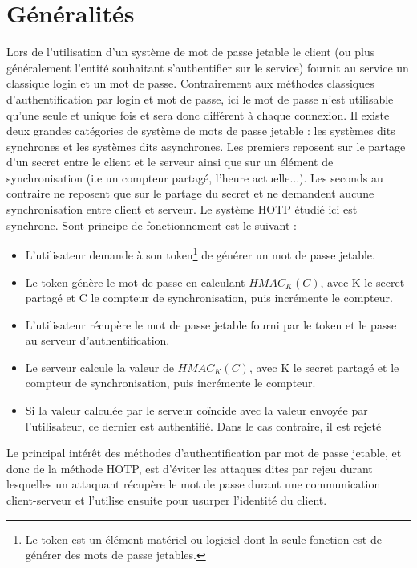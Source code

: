 \documentclass{../res/univ-projet}
\begin{document}
\section{Généralités}
Lors de l'utilisation d'un système de mot de passe jetable le client (ou plus généralement l'entité souhaitant s'authentifier sur le service) fournit au service un 
classique login et un mot de passe. Contrairement aux méthodes classiques d'authentification par login et mot de passe, ici le mot de passe n'est utilisable qu'une seule et 
unique fois et sera donc différent à chaque connexion.
Il existe deux grandes catégories de système de mots de passe jetable : les systèmes dits \og{}synchrones\fg{} et les systèmes dits \og{}asynchrones\fg{}. Les premiers 
reposent sur le partage d'un secret entre le client et le serveur ainsi que sur un élément de synchronisation (i.e un compteur partagé, l'heure actuelle...). Les seconds 
au contraire ne reposent que sur le partage du secret et ne demandent aucune synchronisation entre client et serveur.
Le système \og{}HOTP\fg{} étudié ici est synchrone. Sont principe de fonctionnement est le suivant :
\begin{itemize}
 \item L'utilisateur demande à son token\footnote{Le token est un élément matériel ou logiciel dont la seule fonction est de générer des mots de passe jetables.} de 
 générer un mot de passe jetable.
 \item Le token génère le mot de passe en calculant $HMAC_K(C)$, avec K le secret partagé et C le compteur de synchronisation, puis incrémente le compteur.
 \item L'utilisateur récupère le mot de passe jetable fourni par le token et le passe au serveur d'authentification.
 \item Le serveur calcule la valeur de $HMAC_K(C)$, avec K le secret partagé et le compteur de synchronisation, puis incrémente le compteur.
 \item Si la valeur calculée par le serveur coïncide avec la valeur envoyée par l'utilisateur, ce dernier est authentifié. Dans le cas contraire, il est rejeté
\end{itemize}

Le principal intérêt des méthodes d'authentification par mot de passe jetable, et donc de la méthode HOTP, est d'éviter les attaques dites \og{}par rejeu\fg{} durant 
lesquelles un attaquant récupère le mot de passe durant une communication client-serveur et l'utilise ensuite pour usurper l'identité du client.
\end{document}
